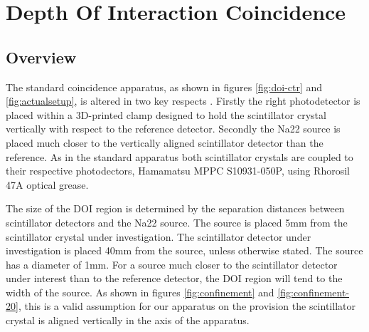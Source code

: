 \section{Depth Of Interaction Coincidence}
\subsection{Overview}
The standard coincidence apparatus, as shown in figures \ref{fig:doi-ctr} and \ref{fig:actualsetup}, is altered in two key respects . Firstly the right photodetector is placed within a 3D-printed clamp designed to hold the scintillator crystal vertically with respect to the reference detector. Secondly the Na22 source is placed much closer to the vertically aligned scintillator detector than the reference. As in the standard apparatus both scintillator crystals are coupled to their respective photodectors, Hamamatsu MPPC S10931-050P, using Rhorosil 47A optical grease. 

The size of the DOI region is determined by the separation distances between scintillator detectors and the Na22 source.  The source is placed 5mm from the scintillator crystal under investigation. The scintillator detector under investigation is placed 40mm from the source, unless otherwise stated. The source has a diameter of 1mm. For a source much closer to the scintillator detector under interest than to the reference detector, the DOI region will tend to the width of the source. As shown in figures \ref{fig:confinement} and \ref{fig:confinement-20}, this is a valid assumption for our apparatus on the provision the scintillator crystal is aligned vertically in the axis of the apparatus.
